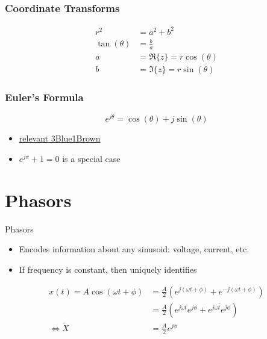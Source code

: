 \documentclass[aspectratio=169]{beamer}
\begin{document}
\begin{frame}
    \frametitle{Coordinate Transforms}

    \begin{align}
        r^2 &= a^2 + b^2 \\
        \tan(\theta) &= \frac{b}{a} \\
        a &= \Re\{z\} = r \cos(\theta) \\
        b &= \Im\{z\} = r \sin(\theta)
    \end{align}
\end{frame}

\begin{frame}
    \frametitle{Euler's Formula}

    \begin{equation}
        e^{j \theta} = \cos(\theta) + j \sin(\theta)
    \end{equation}
    \begin{itemize}
        \item \href{https://youtu.be/v0YEaeIClKY}{relevant 3Blue1Brown}
        \item \(e^{j \pi} + 1 = 0\) is a special case
    \end{itemize}
\end{frame}

\section{Phasors}

\begin{frame}{Phasors}
    \begin{itemize}
        \item Encodes information about any sinusoid: voltage, current, etc.
        \item If frequency is constant, then uniquely identifies
    \end{itemize}
    \begin{align}
        x(t) = A \cos(\omega t + \phi) &= \frac{A}{2} \left(e^{j (\omega t + \phi)} + e^{-j (\omega t + \phi)}\right) \\
        &= \frac{A}{2} \left(e^{j \omega t} e^{j \phi} + \overline{e^{j \omega t} e^{j \phi}}\right) \\
        \iff \widetilde{X} &= \frac{A}{2} e^{j \phi}
    \end{align}
\end{frame}
\end{document}
